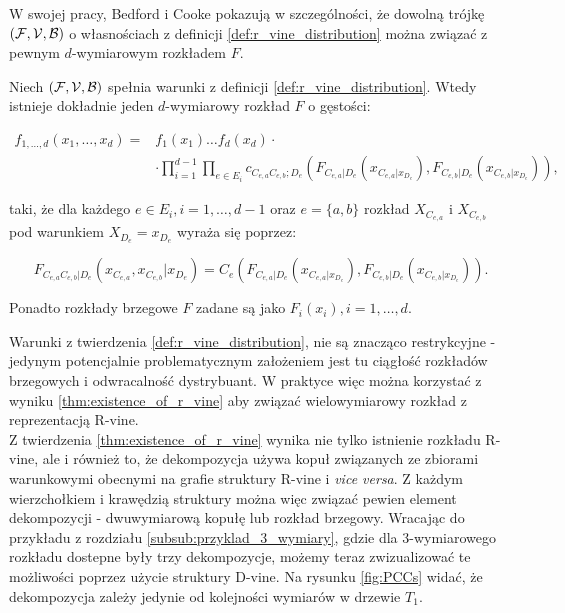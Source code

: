 W swojej pracy, Bedford i Cooke pokazują w szczególności, że dowolną trójkę $(\mathcal{F}, \mathcal{V}, \mathcal{B})$ o własnościach z definicji \ref{def:r_vine_distribution} można związać z pewnym $d$-wymiarowym rozkładem $F$.

\begin{thm}
	Niech $(\mathcal{F}, \mathcal{V}, \mathcal{B})$ spełnia warunki z definicji \ref{def:r_vine_distribution}. Wtedy istnieje dokładnie jeden $d$-wymiarowy rozkład $F$ o gęstości:
	
	\begin{equation*}
		\begin{split}
			f_{1, \dots, d}(x_1, \dots, x_d) = &f_1(x_1)\dots f_d(x_d) \cdot\\
			& \cdot \prod_{i=1}^{d-1}\prod_{e\in E_i}c_{C_{e, a}C_{e, b};D_e}(F_{C_{e, a}\vert D_e}(x_{C_{e, a}|x_{D_e}}), F_{C_{e, b}\vert D_e}(x_{C_{e, b}|x_{D_e}})),
		\end{split}
	\end{equation*}

	taki, że dla każdego $e\in E_i, i = 1,\dots, d-1$ oraz $e=\{a, b\}$ rozkład $X_{C_{e, a}}$ i $X_{C_{e,b}}$ pod warunkiem $X_{D_e} = x_{D_e}$ wyraża się poprzez:
	
	$$ F_{C_{e, a}C_{e, b}\vert D_e}(x_{C_{e, a}}, x_{C_{e, b}}|x_{D_e}) = C_{e}(F_{C_{e, a}\vert D_e}(x_{C_{e, a}|x_{D_e}}), F_{C_{e, b}\vert D_e}(x_{C_{e, b}|x_{D_e}})).$$
	
	Ponadto rozkłady brzegowe $F$ zadane są jako $F_i(x_i), i = 1,\dots, d.$
	\label{thm:existence_of_r_vine}
\end{thm}

Warunki z twierdzenia \ref{def:r_vine_distribution}, nie są znacząco restrykcyjne - jedynym potencjalnie problematycznym założeniem jest tu ciągłość rozkładów brzegowych i odwracalność dystrybuant. W praktyce więc można korzystać z wyniku \ref{thm:existence_of_r_vine} aby związać wielowymiarowy rozkład z reprezentacją R-vine.\\
Z twierdzenia \ref{thm:existence_of_r_vine} wynika nie tylko istnienie rozkładu R-vine, ale i również to, że dekompozycja używa kopuł związanych ze zbiorami warunkowymi obecnymi na grafie struktury R-vine i \emph{vice versa}. Z każdym wierzchołkiem i krawędzią struktury można więc związać pewien element dekompozycji - dwuwymiarową kopułę lub rozkład brzegowy. Wracając do przykładu z rozdziału \ref{subsub:przyklad_3_wymiary}, gdzie dla 3-wymiarowego rozkładu dostepne były trzy dekompozycje, możemy teraz zwizualizować te możliwości poprzez użycie struktury D-vine. Na rysunku \ref{fig:PCCs} widać, że dekompozycja zależy jedynie od kolejności wymiarów w drzewie $T_1$.

